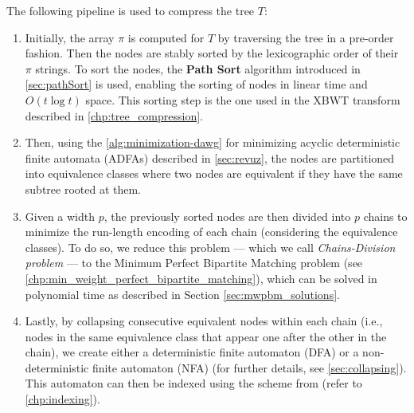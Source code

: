 The following pipeline is used to compress the tree $T$:
\begin{enumerate}
    \item Initially, the array $\pi$ is computed for $T$ by traversing the tree in a pre-order fashion. Then the nodes are stably sorted by the lexicographic order of their $\pi$ strings. To sort the nodes, the \textbf{Path Sort} algorithm introduced in \cref{sec:pathSort} is used, enabling the sorting of nodes in linear time and $O(t \log t)$ space. This sorting step is the one used in the XBWT transform described in \cref{chp:tree_compression}.
    \item Then, using the \cref{alg:minimization-dawg} for minimizing acyclic deterministic finite automata (ADFAs) described in \cref{sec:revuz}, the nodes are partitioned into equivalence classes where two nodes are equivalent if they have the same subtree rooted at them.
    \item Given a width $p$, the previously sorted nodes are then divided into $p$ chains to minimize the run-length encoding of each chain (considering the equivalence classes). To do so, we reduce this problem --- which we call \emph{Chains-Division problem} --- to the Minimum Perfect Bipartite Matching problem (see \cref{chp:min_weight_perfect_bipartite_matching}), which can be solved in polynomial time as described in Section \cref{sec:mwpbm_solutions}.
    \item Lastly, by collapsing consecutive equivalent nodes within each chain (i.e., nodes in the same equivalence class that appear one after the other in the chain), we create either a deterministic finite automaton (DFA) or a non-deterministic finite automaton (NFA) (for further details, see \cref{sec:collapsing}). This automaton can then be indexed using the scheme from \cite{cotumaccio2023co} (refer to \cref{chp:indexing}). %
\end{enumerate}